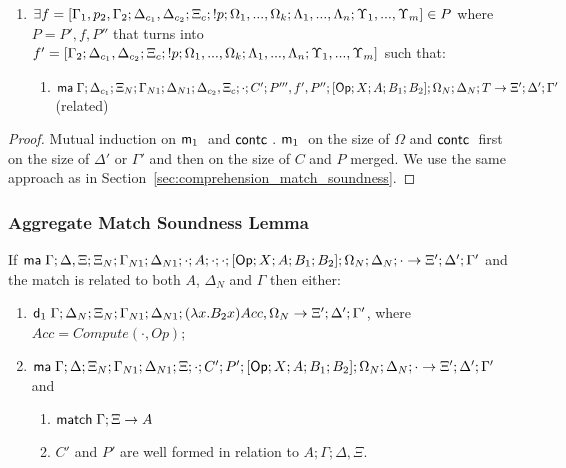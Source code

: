 \begin{theorem}
\begin{itemize}
\begin{enumerate}
      \item $\exists f = [\Gamma_1, p_2, \Gamma_2; \Delta_{c_1}, \Delta_{c_2}; \Xi_c; {!} p; \Omega_1, ..., \Omega_k; \Lambda_1, ..., \Lambda_n; \Upsilon_1, ..., \Upsilon_m] \in P$ where $P = P', f, P''$ that turns into $f' = [\Gamma_2; \Delta_{c_1}, \Delta_{c_2}; \Xi_c; {!} p; \Omega_1, ..., \Omega_k; \Lambda_1, ..., \Lambda_n; \Upsilon_1, ..., \Upsilon_m]$ such that:
            \begin{enumerate}
               \item $\mathsf{ma} \; \Gamma; \Delta_{c_1}; \Xi_N; \Gamma_{N1}; \Delta_{N1}; \Delta_{c_2}, \Xi_c; \cdot; C'; P''', f', P''; [\mathsf{Op} ; X ; A ; B_1; B_2]; \Omega_N; \Delta_N; T \rightarrow \Xi'; \Delta'; \Gamma'$ (related)
            \end{enumerate}
   \end{enumerate}
   \end{itemize}
\end{theorem}

\begin{proof}
   Mutual induction on $\mathsf{m}_1 \;$ and $\mathsf{contc} \;$. $\mathsf{m}_1 \;$ on the size of $\Omega$ and $\mathsf{contc} \;$ first on the size of $\Delta'$ or $\Gamma'$ and then on the size of $C$ and $P$ merged. We use the same approach as in Section~\ref{sec:comprehension_match_soundness}.
\end{proof}

\subsubsection{Aggregate Match Soundness Lemma}

\begin{lemma}
If $\mathsf{ma} \; \Gamma; \Delta, \Xi; \Xi_N; \Gamma_{N1}; \Delta_{N1}; \cdot; A; \cdot; \cdot; [\mathsf{Op} ; X ; A ; B_1; B_2]; \Omega_N; \Delta_N; \cdot \rightarrow \Xi'; \Delta'; \Gamma'$ and the match is related to both $A$, $\Delta_N$ and $\Gamma$ then either:
\begin{enumerate}
   \item $\mathsf{d}_1 \; \Gamma; \Delta_N; \Xi_N; \Gamma_{N1}; \Delta_{N1}; (\lambda x. B_2 x)Acc, \Omega_N \rightarrow \Xi'; \Delta'; \Gamma'$, where $Acc = Compute(\cdot, Op)$;
   \item $\mathsf{ma} \; \Gamma; \Delta; \Xi_N; \Gamma_{N1}; \Delta_{N1}; \Xi; \cdot; C'; P'; [\mathsf{Op} ; X ; A ; B_1; B_2]; \Omega_N; \Delta_N; \cdot \rightarrow \Xi'; \Delta'; \Gamma'$ and
   \begin{enumerate}
      \item $\mathsf{match} \; \Gamma; \Xi \rightarrow A$
      \item $C'$ and $P'$ are well formed in relation to $A; \Gamma; \Delta, \Xi$.
   \end{enumerate}
\end{enumerate}
\end{lemma}

